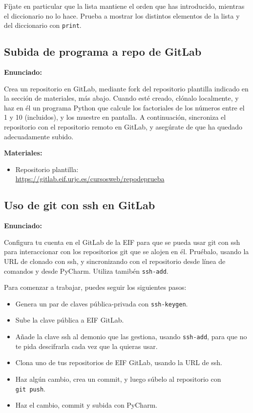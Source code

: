 Fíjate en particular que la lista mantiene el
orden que has introducido, mientras el diccionario no lo hace. Prueba a mostrar 
los distintos elementos de la lista y del diccionario con \verb|print|.

\subsection{Subida de programa a repo de GitLab}
\label{subsec:practicas-programa-gitlab}

\textbf{Enunciado:}

Crea un repositorio en GitLab, mediante fork del repositorio plantilla indicado en la sección de materiales, más abajo. Cuando esté creado, clónalo localmente, y haz en él un programa Python que calcule los factoriales de los números entre el 1 y 10 (incluidos), y los muestre en pantalla. A continuación, sincroniza el repositorio con el repositorio remoto en GitLab, y asegúrate de que ha quedado adecuadamente subido.

\textbf{Materiales:}

\begin{itemize}
\item Repositorio plantilla: \\
  \url{https://gitlab.eif.urjc.es/cursosweb/repodeprueba}
\end{itemize}

\subsection{Uso de git con ssh en GitLab}
\label{subsec:practicas-programa-gitssh}

\textbf{Enunciado:}

Configura tu cuenta en el GitLab de la EIF para que se pueda usar git con ssh para interaccionar con los repositorios git que se alojen en él. Pruébalo, usando la URL de clonado con ssh, y sincronizando con el repositorio desde línea de comandos y desde PyCharm. Utiliza tamibén \texttt{ssh-add}.

Para comenzar a trabajar, puedes seguir los siguientes pasos:

\begin{itemize}
\item Genera un par de claves pública-privada con \texttt{ssh-keygen}.
\item Sube la clave pública a EIF GitLab.
\item Añade la clave ssh al demonio que las gestiona, usando \texttt{ssh-add}, para que no te pida descifrarla cada vez que la quieras usar.
\item Clona uno de tus repositorios de EIF GitLab, usando la URL de ssh.
\item Haz algún cambio, crea un commit, y luego súbelo al repositorio con \texttt{git~push}.
\item Haz el cambio, commit y subida con PyCharm.
\end{itemize}

